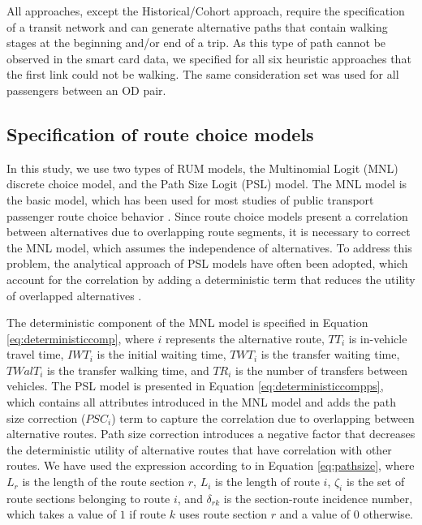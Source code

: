 \documentclass[12pt,a4paper]{article}
\begin{document}
All approaches, except the Historical/Cohort approach, require the specification of a transit network and can generate alternative paths that contain walking stages at the beginning and/or end of a trip. As this type of path cannot be observed in the smart card data, we specified for all six heuristic approaches that the first link could not be walking. The same consideration set was used for all passengers between an OD pair.

\subsection{Specification of route choice models}

In this study, we use two types of RUM models, the Multinomial Logit (MNL) discrete choice model, and the Path Size Logit (PSL) model. The MNL model is the basic model, which has been used for most studies of public transport passenger route choice behavior \citep{kim2019calibration, ton2020understanding, nassir2018strategy, grison2017users, janovsikova2014estimation, raveau2011topological, raveau2014behavioural, raveau2014analyzing, schmocker2013generation, guo2011mind, vrtic2002impact}. Since route choice models present a correlation between alternatives due to overlapping route segments, it is necessary to correct the MNL model, which assumes the independence of alternatives. To address this problem, the analytical approach of PSL models have often been adopted, which account for the correlation by adding a deterministic term that reduces the utility of overlapped alternatives \citep{arriagada2022unveiling, yap2020crowding, rui2016modeling, anderson2017multimodal, bovy2005modelling, de2012fixed, hoogendoorn2005path, nielsen2020relevance}. 

The deterministic component of the MNL model is specified in Equation \ref{eq:deterministiccomp}, where $i$ represents the alternative route, $TT_{i}$ is in-vehicle travel time, $IWT_{i}$ is the initial waiting time, $TWT_{i}$ is the transfer waiting time, $TWalT_{i}$ is the transfer walking time, and $TR_{i}$ is the number of transfers between vehicles. The PSL model is presented in Equation \ref{eq:deterministiccompps}, which contains all attributes introduced in the MNL model and adds the path size correction ($PSC_{i}$) term to capture the correlation due to overlapping between alternative routes. Path size correction introduces a negative factor that decreases the deterministic utility of alternative routes that have correlation with other routes. We have used the expression according to \cite{bovy2008factor} in Equation \ref{eq:pathsize}, where $L_{r}$ is the length of the route section $r$, $L_{i}$ is the length of route $i$, $\zeta_{i}$ is the set of route sections belonging to route $i$, and $\delta_{rk}$ is the section-route incidence number, which takes a value of $1$ if route $k$ uses route section $r$ and a value of $0$ otherwise.
\end{document}
